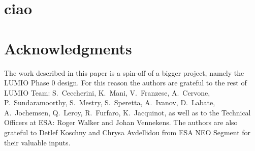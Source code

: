 \documentclass{iac} %
\begin{document}

\maketitle{}


\section{ciao}
\cite{szabo2013eight}
%
%
%
%
%


\section*{Acknowledgments}
The work described in this paper is a spin-off of a bigger project, namely the LUMIO Phase $0$ design. For this reason the authors are grateful to the rest of LUMIO Team: S.\ Ceccherini, K.\ Mani, V.\ Franzese, A.\ Cervone, P.\ Sundaramoorthy, S.\ Mestry, S.\ Speretta, A.\ Ivanov, D.\ Labate, A.\ Jochemsen, Q.\ Leroy, R.\ Furfaro, K.\ Jacquinot, as well as to the Technical Officers at ESA: Roger Walker and Johan Vennekens. The authors are also grateful to Detlef Koschny and Chrysa Avdellidou from ESA NEO Segment for their valuable inputs.

\printbibliography
\end{document}
